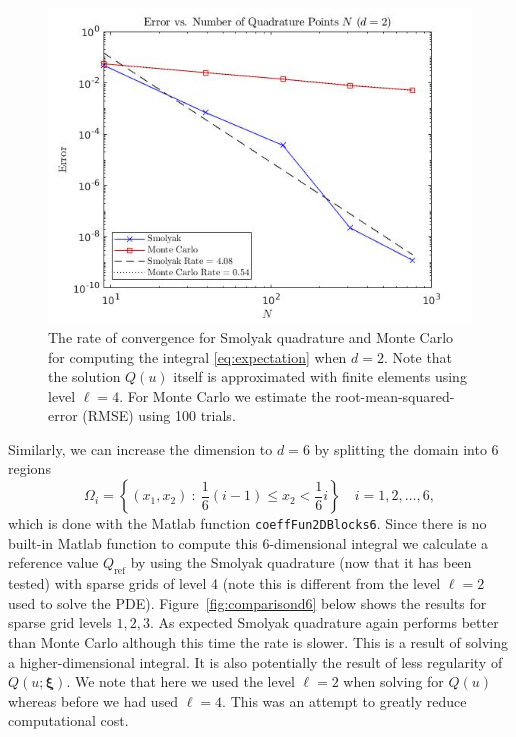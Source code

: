 \documentclass[12pt]{article}
\begin{document}
\begin{enumerate}
\begin{figure}[H]
\centering
\includegraphics[width=5in]{smolyak_mc_error_d2.jpg}
\caption{The rate of convergence for Smolyak quadrature and Monte Carlo for computing the integral \ref{eq:expectation} when $d=2$. Note that the solution $Q(u)$ itself is approximated with finite elements using level $\ell = 4$.  For Monte Carlo we estimate the root-mean-squared-error (RMSE) using 100 trials.}
\label{fig:comparisond2}
\end{figure}

\hspace{0.5cm} Similarly, we can increase the dimension to $d=6$ by splitting the domain into 6 regions
\begin{equation}
\label{eq:domains}
\Omega_i = \left\{(x_1,x_2)\ :\  \frac{1}{6}(i-1) \le x_2 < \frac{1}{6}i  \right\} \quad i=1,2,\ldots,6,
\end{equation}
which is done with the Matlab function {\tt coeffFun2DBlocks6}.  Since there is no built-in Matlab function to compute this 6-dimensional integral we calculate a reference value $Q_{\text{ref}}$ by using the Smolyak quadrature (now that it has been tested) with sparse grids of level 4 (note this is different from the level $\ell = 2$ used to solve the PDE).  Figure~\ref{fig:comparisond6} below shows the results for sparse grid levels $1,2,3$.  As expected Smolyak quadrature again performs better than Monte Carlo although this time the rate is slower.  This is a result of solving a higher-dimensional integral.  It is also potentially the result of less regularity of $Q(u; {\bm \xi})$.  We note that here we used the level $\ell = 2$ when solving for $Q(u)$ whereas before we had used $\ell = 4$.  This was an attempt to greatly reduce computational cost.



\end{enumerate}
\end{document}
